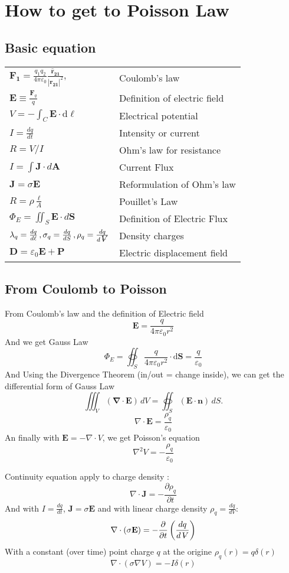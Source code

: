 \documentclass[twocolumn]{article}
\newcommand{\volume}{\mathop{\ooalign{\hfil$V$\hfil\cr\kern0.08em--\hfil\cr}}\nolimits}
\begin{document}
\section{How to get to Poisson Law}
\subsection{Basic equation}
\begin{tabular}{@{}ll@{}}
$\boldsymbol{F_1}=\frac{q_1q_2}{4\pi\varepsilon_0} \frac{\boldsymbol{\hat{r}_{21}}}{ |\boldsymbol{r_{21}}|^2}, $ & Coulomb's law\\
$\mathbf{E}\equiv \frac{\mathbf{F}_{q}}{q}$ & Definition of electric field\\
$V = - \int_C \mathbf{E} \cdot \mathrm{d} \boldsymbol{\ell} \, $ & Electrical potential \\
$I = \frac{dq}{dt}$ & Intensity or current\\
$R = V/I$  & Ohm's law for resistance \\
$I=\int\mathbf{J}\cdot d\mathbf{A}$ & Current Flux\\
$\mathbf{J} = \sigma \mathbf{E}$ & Reformulation of Ohm's law \\
$R = \rho \frac{\ell}{A}$ & Pouillet's Law\\
$\Phi_E = \iint_S \mathbf{E} \cdot d\mathbf{S}$ & Definition of Electric Flux \\
$\lambda_q = \frac{d q}{d \ell}\,, \sigma_q = \frac{d q}{d S}\,, \rho_q =\frac{d q}{d \volume}$ & Density charges \\
$  \boldsymbol{D} = \varepsilon_0  \boldsymbol{E} +  \boldsymbol{P} $ & Electric displacement field \\
\end{tabular}

\subsection{From Coulomb to Poisson}
From Coulomb's law and the definition of Electric field
\[ \mathbf{E} = \frac{q}{4\pi\varepsilon_0 r^2}  \] 
And we get Gauss Law
\[ \Phi_E = \oiint_S \frac{q}{4\pi\varepsilon_0 r^2} \cdot \mathrm{d}\mathbf{S} = \frac{q}{\varepsilon_0}\]
And Using the Divergence Theorem (in/out = change inside), we can get the differential form of Gauss Law
\[ \iiint_V\left(\mathbf{\nabla}\cdot\mathbf{E}\right)\,dV=\oiint_S(\mathbf{E}\cdot\mathbf{n})\,dS .\]
\[\nabla \cdot \mathbf{E} = \frac{\rho_q}{\varepsilon_0}\]
An finally with $\mathbf{E} = -\nabla \cdot V$, we get Poisson's equation
 \[ {\nabla}^2 V = -\frac{\rho_q}{\varepsilon_0} \]


Continuity equation apply to charge density :
\[  \nabla \cdot \mathbf{J} = - \frac{\partial \rho_q}{ \partial t}  \]
And with $I = \frac{dq}{dt}$, $\mathbf{J} = \sigma \mathbf{E}$ and with linear charge density  $\rho_q =\frac{d q}{d V}$:
\[ \nabla \cdot (\sigma \mathbf{E}) = -\frac{\partial}{\partial t} \left(  \frac{dq}{d\volume}\right)\]
With a constant (over time) point charge $q$ at the origine $\rho_q(r) = q\delta(r)$
\[ \nabla \cdot (\sigma \nabla V) =-I \delta (r) \]
\end{document}
